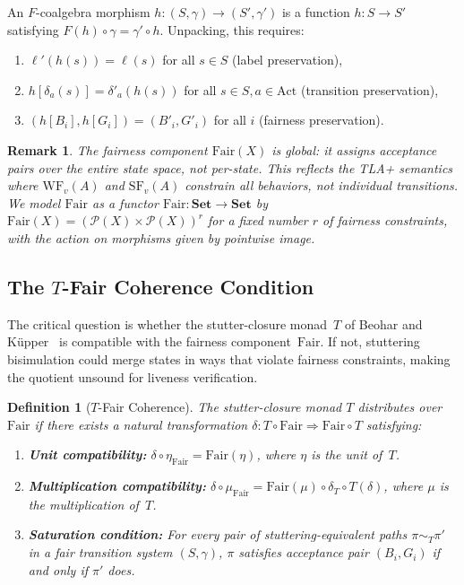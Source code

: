 \documentclass[11pt]{article}
\newtheorem{definition}[theorem]{Definition}
\newtheorem{remark}[theorem]{Remark}
\newcommand{\Set}{\mathbf{Set}}
\newcommand{\Pow}{\mathcal{P}}
\newcommand{\Fair}{\ensuremath{\mathrm{Fair}}}
\newcommand{\Act}{\ensuremath{\mathrm{Act}}}
\newcommand{\WF}{\ensuremath{\mathrm{WF}}}
\newcommand{\SF}{\ensuremath{\mathrm{SF}}}
\newcommand{\TFair}{$T$-Fair}
\begin{document}
An $F$-coalgebra morphism $h : (S, \gamma) \to (S', \gamma')$ is a function
$h : S \to S'$ satisfying $F(h) \circ \gamma = \gamma' \circ h$.
Unpacking, this requires:
\begin{enumerate}[nosep]
\item $\ell'(h(s)) = \ell(s)$ for all $s \in S$ (label preservation),
\item $h[\delta_a(s)] = \delta'_a(h(s))$ for all $s \in S, a \in \Act$
  (transition preservation),
\item $(h[B_i], h[G_i]) = (B'_i, G'_i)$ for all $i$ (fairness preservation).
\end{enumerate}

\begin{remark}
The fairness component $\Fair(X)$ is \emph{global}: it assigns acceptance
pairs over the entire state space, not per-state.
This reflects the TLA+ semantics where $\WF_v(A)$ and $\SF_v(A)$ constrain
all behaviors, not individual transitions.
We model $\Fair$ as a functor $\Fair : \Set \to \Set$ by
$\Fair(X) = (\Pow(X) \times \Pow(X))^r$ for a fixed number $r$ of fairness
constraints, with the action on morphisms given by pointwise image.
\end{remark}

\subsection{The \TFair{} Coherence Condition}

The critical question is whether the stutter-closure monad~$T$ of
Beohar and K\"upper~\cite{BeoharK17} is compatible with the fairness
component~$\Fair$.
If not, stuttering bisimulation could merge states in ways that violate
fairness constraints, making the quotient unsound for liveness verification.

\begin{definition}[\TFair{} Coherence]
\label{def:tfair}
The stutter-closure monad $T$ \emph{distributes over} $\Fair$ if there
exists a natural transformation
$\delta : T \circ \Fair \Rightarrow \Fair \circ T$
satisfying:
\begin{enumerate}[nosep]
\item \textbf{Unit compatibility:}
  $\delta \circ \eta_{\Fair} = \Fair(\eta)$, where $\eta$ is the unit of~$T$.
\item \textbf{Multiplication compatibility:}
  $\delta \circ \mu_{\Fair} = \Fair(\mu) \circ \delta_T \circ T(\delta)$,
  where $\mu$ is the multiplication of~$T$.
\item \textbf{Saturation condition:} For every pair of
  stuttering-equivalent paths $\pi \sim_T \pi'$ in a fair transition
  system $(S, \gamma)$, $\pi$ satisfies acceptance pair $(B_i, G_i)$ if
  and only if $\pi'$ does.
\end{enumerate}
\end{definition}
\end{document}
